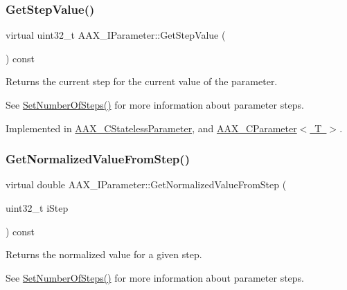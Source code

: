 \mbox{\label{a01857_ad4fc7431439f53cc0253d191b19db00b}} 
\subsubsection{\texorpdfstring{GetStepValue()}{GetStepValue()}}
{\footnotesize\ttfamily virtual uint32\+\_\+t A\+A\+X\+\_\+\+I\+Parameter\+::\+Get\+Step\+Value (\begin{DoxyParamCaption}{ }\end{DoxyParamCaption}) const\hspace{0.3cm}{\ttfamily [pure virtual]}}



Returns the current step for the current value of the parameter. 

See \mbox{\hyperlink{a01857_ac81903d0388a03045a57dd4c455b6f02}{Set\+Number\+Of\+Steps()}} for more information about parameter steps. 

Implemented in \mbox{\hyperlink{a01541_a3b974a1d9aedf044339741b0035007e8}{A\+A\+X\+\_\+\+C\+Stateless\+Parameter}}, and \mbox{\hyperlink{a01537_a9743c6c0416e93078f377c40e9482021}{A\+A\+X\+\_\+\+C\+Parameter$<$ T $>$}}.

\mbox{\label{a01857_a793cc6ffe2688f26e2afb8277e07ade6}} 
\subsubsection{\texorpdfstring{GetNormalizedValueFromStep()}{GetNormalizedValueFromStep()}}
{\footnotesize\ttfamily virtual double A\+A\+X\+\_\+\+I\+Parameter\+::\+Get\+Normalized\+Value\+From\+Step (\begin{DoxyParamCaption}\item[{uint32\+\_\+t}]{i\+Step }\end{DoxyParamCaption}) const\hspace{0.3cm}{\ttfamily [pure virtual]}}



Returns the normalized value for a given step. 

See \mbox{\hyperlink{a01857_ac81903d0388a03045a57dd4c455b6f02}{Set\+Number\+Of\+Steps()}} for more information about parameter steps. 

